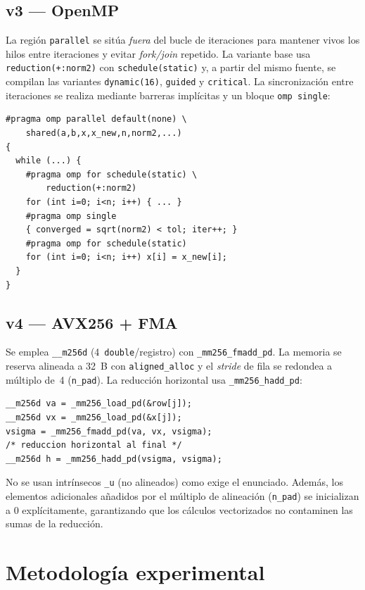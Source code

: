 \documentclass[a4paper,twocolumn]{article}
\begin{document}
\subsection{v3 --- OpenMP}

La región \texttt{parallel} se sitúa \textit{fuera} del bucle de
iteraciones para mantener vivos los hilos entre iteraciones y evitar
\textit{fork/join} repetido.  La variante base usa
\texttt{reduction(+:norm2)} con \texttt{schedule(static)} y, a partir del mismo
fuente, se compilan las variantes \texttt{dynamic(16)}, \texttt{guided} y
\texttt{critical}.  La sincronización entre iteraciones se realiza mediante
barreras implícitas y un bloque \texttt{omp single}:

\begin{lstlisting}
#pragma omp parallel default(none) \
    shared(a,b,x,x_new,n,norm2,...)
{
  while (...) {
    #pragma omp for schedule(static) \
        reduction(+:norm2)
    for (int i=0; i<n; i++) { ... }
    #pragma omp single
    { converged = sqrt(norm2) < tol; iter++; }
    #pragma omp for schedule(static)
    for (int i=0; i<n; i++) x[i] = x_new[i];
  }
}
\end{lstlisting}

\subsection{v4 --- AVX256 + FMA}

Se emplea \texttt{\_\_m256d} (4~\texttt{double}/registro) con
\texttt{\_mm256\_fmadd\_pd}.  La memoria se reserva alineada a 32~B con
\texttt{aligned\_alloc} y el \textit{stride} de fila se redondea a múltiplo
de~4 (\texttt{n\_pad}).  La reducción horizontal usa \texttt{\_mm256\_hadd\_pd}:

\begin{lstlisting}
__m256d va = _mm256_load_pd(&row[j]);
__m256d vx = _mm256_load_pd(&x[j]);
vsigma = _mm256_fmadd_pd(va, vx, vsigma);
/* reduccion horizontal al final */
__m256d h = _mm256_hadd_pd(vsigma, vsigma);
\end{lstlisting}

No se usan intrínsecos \texttt{\_u} (no alineados) como exige el enunciado. Además, los elementos adicionales añadidos por el múltiplo de alineación (\texttt{n\_pad}) se inicializan a 0 explícitamente, garantizando que los cálculos vectorizados no contaminen las sumas de la reducción.

\section{Metodología experimental}
\end{document}
